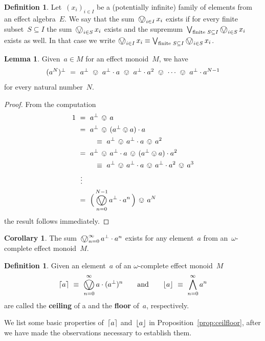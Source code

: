 \documentclass[10pt,conference]{IEEEtran}
\DeclarePairedDelimiter{\ceil}{\lceil}{\rceil}
\DeclarePairedDelimiter{\floor}{\lfloor}{\rfloor}
\newcommand\Define[1]{\textbf{#1}}
\newcounter{counter}
\theoremstyle{definition}
\newtheorem{lemma}[counter]{Lemma}
\newtheorem{definition}[counter]{Definition}
\newtheorem{corollary}[counter]{Corollary}
\newcommand{\bigovee}{\mathop{\vphantom{\sum}\mathchoice%
        {\vcenter{\hbox{\huge $\ovee$}}}%
        {\vcenter{\hbox{\Large $\ovee$}}}%
        {\ovee}{\ovee}}\displaylimits}
\begin{document}
\begin{definition}
    Let~$(x_i)_{i \in I}$ be a (potentially infinite)
    family of elements from an effect algebra~$E$.
    We say that the sum~$\bigovee_{i \in I} x_i$ exists
        if for every finite subset~$S \subseteq I$
        the sum~$\bigovee_{i \in S} x_i$ exists
        and the supremum~$\bigvee_{\text{finite }S \subseteq I}
        \bigovee_{i \in S} x_i$ exists
            as well.
    In that case we write $\bigovee_{i \in I} x_i \equiv
        \bigvee_{\text{finite }S \subseteq I}
        \bigovee_{i \in S} x_i$.
\end{definition}
\begin{lemma}
    \label{lem:proto-ceilfloor}
Given~$a \in M$ for an effect monoid~$M$, we have
\begin{equation*}
    \textstyle
    (a^N)^\perp\ =\ a^\perp\ \ovee\  a^\perp \cdot a\ \ovee\  a^\perp \cdot a^2
    \ \ovee\  \dotsb\ \ovee\  a^\perp \cdot a^{N-1}
\end{equation*}
for every natural number~$N$.
\end{lemma}
\begin{proof}
From the computation
    \begin{equation*}
\begin{alignedat}{3}
1 \ &=\ a^\perp \,\ovee\,a
\\
    &=\  a^\perp \,\ovee\,(a^\perp\ovee a)\cdot a \\
    &\qquad\ \equiv\  a^\perp\,\ovee\,a^\perp \cdot a \,\ovee\,a^2
\\
    &=\  a^\perp \,\ovee\,a^\perp \cdot a \,\ovee\,(a^\perp\ovee a) \cdot a^2 \\
    & \qquad \ \equiv\  a^\perp\,\ovee\,a^\perp\cdot a
    \,\ovee\, a^\perp\cdot  a^2\,\ovee\,
    a^3
\\
    &\ \vdots
\\
    &=\ \Bigl(\,\bigovee_{n=0}^{N-1} a^\perp \cdot a^n\,\Bigr)\,\ovee\, a^N
\end{alignedat}
\end{equation*}
the result follows immediately.
\end{proof}
\begin{corollary}
    The sum~$\bigovee_{n=0}^\infty a^\perp \cdot a^n$ exists
        for any element~$a$ 
        from an~$\omega$-complete effect monoid~$M$.
\end{corollary}
\begin{definition}
Given an element~$a$ of an $\omega$-complete
effect monoid~$M$
    \begin{equation*}
        \ceil{a}\ \equiv\ \bigovee_{n=0}^\infty a\cdot (a^\perp)^n
        \qquad\text{and}\qquad
        \floor{a}\ \equiv \ \bigwedge_{n=0}^\infty a^n
    \end{equation*}
    are called the \Define{ceiling} of a and the \Define{floor}
    of~$a$, respectively.
\end{definition}
We list
some basic properties of~$\ceil{a}$
and~$\floor{a}$ in Proposition~\ref{prop:ceilfloor},
after we have made the observations
necessary to establish them.
\end{document}

